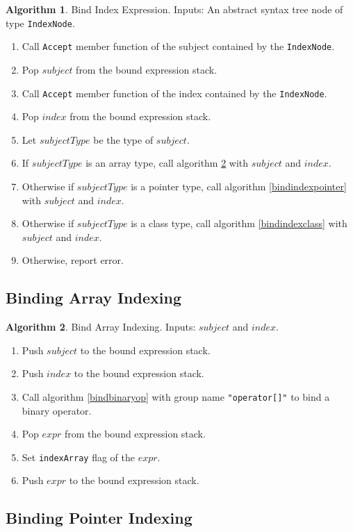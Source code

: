\documentclass[a4paper,oneside,11pt]{book}
\theoremstyle{definition}
\newtheorem{algo}{Algorithm}[section]
\begin{document}
\begin{algo}\label{bindindex} Bind Index Expression.
Inputs: An abstract syntax tree node of type \verb|IndexNode|.
\begin{enumerate}
\item
Call \verb|Accept| member function of the subject contained by the \verb|IndexNode|.
\item
Pop $subject$ from the bound expression stack.
\item
Call \verb|Accept| member function of the index contained by the \verb|IndexNode|.
\item
Pop $index$ from the bound expression stack.
\item
Let $subjectType$ be the type of $subject$.
\item
If $subjectType$ is an array type, call algorithm \ref{bindindexarray} with $subject$ and $index$.
\item
Otherwise if $subjectType$ is a pointer type, call algorithm \ref{bindindexpointer} with $subject$ and $index$.
\item
Otherwise if $subjectType$ is a class type, call algorithm \ref{bindindexclass} with $subject$ and $index$.
\item
Otherwise, report error.
\end{enumerate}
\end{algo}

\subsection{Binding Array Indexing}

\begin{algo}\label{bindindexarray} Bind Array Indexing.
Inputs: $subject$ and $index$.
\begin{enumerate}
\item
Push $subject$ to the bound expression stack.
\item
Push $index$ to the bound expression stack.
\item
Call algorithm \ref{bindbinaryop} with group name \verb|"operator[]"| to bind a binary operator.
\item
Pop $expr$ from the bound expression stack.
\item
Set \verb|indexArray| flag of the $expr$.
\item
Push $expr$ to the bound expression stack.
\end{enumerate}
\end{algo}

\subsection{Binding Pointer Indexing}
\end{document}
